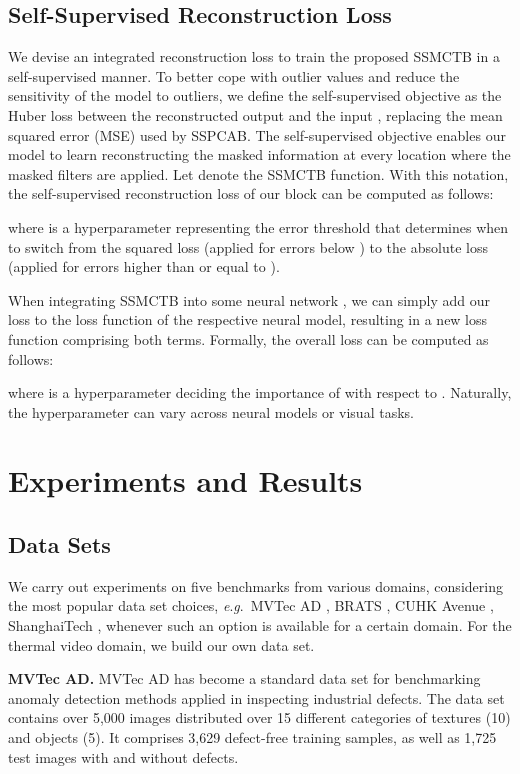 \documentclass[10pt,journal,compsoc]{IEEEtran}
\newcommand{\eg}{\textit{e}.\textit{g}.}
\begin{document}
\subsection{Self-Supervised Reconstruction Loss}

We devise an integrated reconstruction loss to train the proposed SSMCTB in a self-supervised manner. To better cope with outlier values and reduce the sensitivity of the model to outliers, we define the self-supervised objective as the Huber loss between the reconstructed output  and the input , replacing the mean squared error (MSE) used by SSPCAB. The self-supervised objective enables our model to learn reconstructing the masked information at every location where the masked filters are applied. Let  denote the SSMCTB function. With this notation, the self-supervised reconstruction loss of our block can be computed as follows: 

where  is a hyperparameter representing the error threshold that determines when to switch from the squared loss (applied for errors below ) to the absolute loss (applied for errors higher than or equal to ).

When integrating SSMCTB into some neural network , we can simply add our loss  to the loss function  of the respective neural model, resulting in a new loss function comprising both terms. Formally, the overall loss can be computed as follows:

where  is a hyperparameter deciding the importance of  with respect to . Naturally, the hyperparameter  can vary across neural models or visual tasks.

\section{Experiments and Results}
\label{sec_experiments}

\subsection{Data Sets}

We carry out experiments on five benchmarks from various domains, considering the most popular data set choices, \eg~MVTec AD \cite{Bergmann-CVPR-2019}, BRATS \cite{Menze-TMI-2015}, CUHK Avenue \cite{Lu-ICCV-2013}, ShanghaiTech \cite{Luo-ICCV-2017}, whenever such an option is available for a certain domain. For the thermal video domain, we build our own data set.

\noindent
\textbf{MVTec AD.}
MVTec AD \cite{Bergmann-CVPR-2019} has become a standard data set for benchmarking anomaly detection methods applied in inspecting industrial defects. The data set contains over 5,000 images distributed over 15 different categories of textures (10) and objects (5). It comprises 3,629 defect-free training samples, as well as 1,725 test images with and without defects. 
\end{document}
